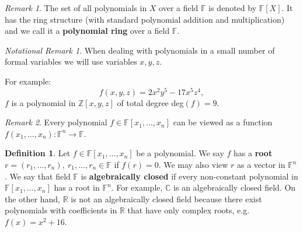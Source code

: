 \documentclass[thesis=M,english]{FITthesis}[2012/10/20]
\theoremstyle{remark}
\newtheorem*{RM}{Remark}
\newtheorem*{NRM}{Notational Remark}
\theoremstyle{definition}
\newtheorem{DF}{Definition}[section]
\begin{document}
\begin{RM}
The set of all polynomials in $X$ over a field $\mathbb{F}$ is denoted by $\mathbb{F}[X]$. It has the ring structure (with standard polynomial addition and multiplication) and we call it a \textbf{polynomial ring} over a field $\mathbb{F}$.
\end{RM}
\begin{NRM}
\noindent When dealing with polynomials in a small number of formal variables we will use variables $x,y,z$. 
\end{NRM}
\noindent For example:
$$
f(x,y,z) = 2x^2y^5 - 17x^5z^4,
$$
$f$ is a polynomial in $\mathbb{Z}[x,y,z]$ of total degree deg$(f)=9.$
\begin{RM}
Every polynomial $f \in \mathbb{F}[x_1,\ldots,x_n]$ can be viewed as a function $f(x_1,\ldots,x_n) : \mathbb{F}^n \to \mathbb{F}$.
\end{RM}
\begin{DF}
Let $f \in \mathbb{F}[x_1,\ldots,x_n]$ be a polynomial. We say $f$ has a \textbf{root} $r = (r_1, \ldots, r_n),\ r_1, \ldots, r_n \in \mathbb{F}$ if $f(r) = 0.$ We may also view $r$ as a vector in $\mathbb{F}^n$. We say that field $\mathbb{F}$ is \textbf{algebraically closed} if every non-constant polynomial in $\mathbb{F}[x_1,\ldots,x_n]$ has a root in $\mathbb{F}^n$. For example, $\mathbb{C}$ is an algebraically closed field. On the other hand, $\mathbb{R}$ is not an algebraically closed field because there exist polynomials with coefficients in $\mathbb{R}$ that have only complex roots, e.g. $f(x) = x^2 + 16$.
\end{DF}
\end{document}
